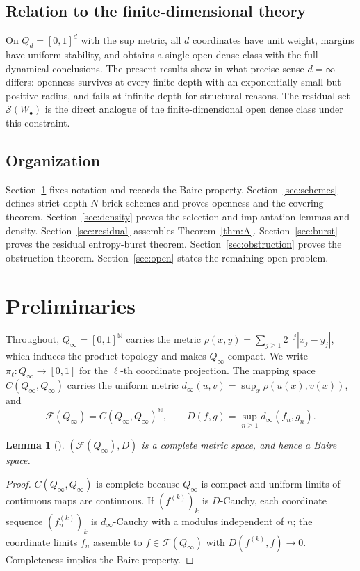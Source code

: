 \documentclass[11pt]{article}
\newtheorem{lemma}[theorem]{Lemma}
\newcommand{\Q}{Q_\infty}
\newcommand{\F}{\mathcal{F}}
\begin{document}
\subsection*{Relation to the finite-dimensional theory}

On $Q_d=[0,1]^d$ with the sup metric, all $d$ coordinates have unit weight, margins
have uniform stability, and \cite{Shmalo2026} obtains a single open dense class with
the full dynamical conclusions.  The present results show in what precise sense
$d=\infty$ differs: openness survives at every finite depth with an exponentially
small but positive radius, and fails at infinite depth for structural reasons.  The
residual set $\mathcal S(W_\bullet)$ is the direct analogue of the finite-dimensional
open dense class under this constraint.

\subsection*{Organization}

Section~\ref{sec:prelim} fixes notation and records the Baire property.
Section~\ref{sec:schemes} defines strict depth-$N$ brick schemes and proves openness
and the covering theorem.  Section~\ref{sec:density} proves the selection and
implantation lemmas and density.  Section~\ref{sec:residual} assembles
Theorem~\ref{thm:A}.  Section~\ref{sec:burst} proves the residual entropy-burst
theorem.  Section~\ref{sec:obstruction} proves the obstruction theorem.
Section~\ref{sec:open} states the remaining open problem.

\section{Preliminaries}\label{sec:prelim}

Throughout, $\Q=[0,1]^{\mathbb N}$ carries the metric
$\rho(x,y)=\sum_{j\ge1}2^{-j}|x_j-y_j|$, which induces the product topology and makes
$\Q$ compact.  We write $\pi_\ell:\Q\to[0,1]$ for the $\ell$-th coordinate projection.
The mapping space $C(\Q,\Q)$ carries the uniform metric
$d_\infty(u,v)=\sup_{x}\rho(u(x),v(x))$, and
\[
\F(\Q)=C(\Q,\Q)^{\mathbb N},\qquad
D(f,g)=\sup_{n\ge1}d_\infty(f_n,g_n).
\]

\begin{lemma}[{\cite[Lemma 2.1]{Shmalo2026}}]\label{lem:baire}
$(\F(\Q),D)$ is a complete metric space, and hence a Baire space.
\end{lemma}

\begin{proof}
$C(\Q,\Q)$ is complete because $\Q$ is compact and uniform limits of continuous maps
are continuous.  If $(f^{(k)})_k$ is $D$-Cauchy, each coordinate sequence
$(f^{(k)}_n)_k$ is $d_\infty$-Cauchy with a modulus independent of $n$; the coordinate
limits $f_n$ assemble to $f\in\F(\Q)$ with $D(f^{(k)},f)\to0$.  Completeness implies
the Baire property.
\end{proof}
\end{document}
